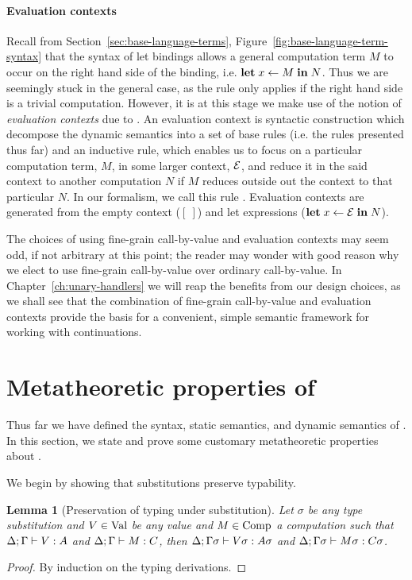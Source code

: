 \documentclass[12pt,phd,lfcs,twoside,openright,logo,leftchapter,normalheadings]{infthesis}
\theoremstyle{plain}
\newtheorem{lemma}[theorem]{Lemma}
\theoremstyle{definition}
\begin{document}
\paragraph{Evaluation contexts}
Recall from Section~\ref{sec:base-language-terms},
Figure~\ref{fig:base-language-term-syntax} that the syntax of let
bindings allows a general computation term $M$ to occur on the right
hand side of the binding, i.e. $\mathbf{let}\;x \leftarrow M \;\mathbf{in}\;N$. Thus we
are seemingly stuck in the general case, as the  rule only
applies if the right hand side is a trivial computation.
%
However, it is at this stage we make use of the notion of
\emph{evaluation contexts} due to \citet{Felleisen87}. An evaluation
context is syntactic construction which decompose the dynamic
semantics into a set of base rules (i.e. the rules presented thus far)
and an inductive rule, which enables us to focus on a particular
computation term, $M$, in some larger context, $\mathcal{E}$, and reduce it in
the said context to another computation $N$ if $M$ reduces outside out
the context to that particular $N$. In our formalism, we call this
rule . Evaluation contexts are generated from the empty
context ($[~]$) and let expressions ($\mathbf{let}\;x \leftarrow \mathcal{E} \;\mathbf{in}\;N$).

The choices of using fine-grain call-by-value and evaluation contexts
may seem odd, if not arbitrary at this point; the reader may wonder
with good reason why we elect to use fine-grain call-by-value over
ordinary call-by-value.  In Chapter~\ref{ch:unary-handlers} we will
reap the benefits from our design choices, as we shall see that the
combination of fine-grain call-by-value and evaluation contexts
provide the basis for a convenient, simple semantic framework for
working with continuations.

\section{Metatheoretic properties of \BCalc{}}
\label{sec:base-language-metatheory}

Thus far we have defined the syntax, static semantics, and dynamic
semantics of \BCalc{}. In this section, we state and prove some
customary metatheoretic properties about \BCalc{}.
%

We begin by showing that substitutions preserve typability.
%
\begin{lemma}[Preservation of typing under substitution]\label{lem:base-language-subst}
  Let $\sigma$ be any type substitution and $V \in \textrm{Val}$ be any
  value and $M \in \textrm{Comp}$ a computation such that
  $\Delta;\Gamma \vdash V : A$ and $\Delta;\Gamma \vdash M : C$, then
  $\Delta;\Gamma\sigma \vdash V\sigma : A\sigma$ and
  $\Delta;\Gamma\sigma \vdash M\sigma : C\sigma$.
\end{lemma}
%
\begin{proof}
  By induction on the typing derivations.
\end{proof}
%
\end{document}
